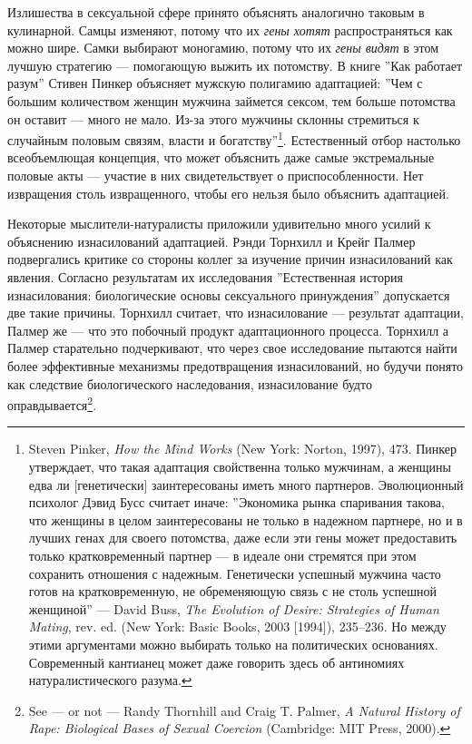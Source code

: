 \documentclass[12pt]{book}
\begin{document}
Излишества в сексуальной сфере принято объяснять аналогично таковым в кулинарной. Самцы изменяют, потому что их \textit{гены хотят} распространяться как можно шире. Самки выбирают моногамию, потому что их \textit{гены видят} в этом лучшую стратегию --- помогающую выжить их потомству. В книге ''Как работает разум'' Стивен Пинкер объясняет мужскую полигамию адаптацией: ''Чем с большим количеством женщин мужчина займется сексом, тем больше потомства он оставит --- много не мало. Из-за этого мужчины склонны стремиться к случайным половым связям, власти и богатству''\footnote{Steven Pinker, \textit{How the Mind Works} (New York: Norton, 1997), 473. Пинкер утверждает, что такая адаптация свойственна только мужчинам, а женщины едва ли [генетически] заинтересованы иметь много партнеров. Эволюционный психолог Дэвид Бусс считает иначе: ''Экономика рынка спаривания такова, что женщины в целом заинтересованы не только в надежном партнере, но и в лучших генах для своего потомства, даже если эти гены может предоставить только кратковременный партнер --- в идеале они стремятся при этом сохранить отношения с надежным. Генетически успешный мужчина часто готов на кратковременную, не обременяющую связь с не столь успешной женщиной'' --- David Buss, \textit{The Evolution of Desire: Strategies of Human Mating}, rev. ed. (New York: Basic Books, 2003 [1994]), 235–236. Но между этими аргументами можно выбирать только на политических основаниях. Современный кантианец может даже говорить здесь об антиномиях натуралистического разума.}. Естественный отбор настолько всеобъемлющая концепция, что может объяснить даже самые экстремальные половые акты --- участие в них свидетельствует о приспособленности. Нет извращения столь извращенного, чтобы его нельзя было объяснить адаптацией.

Некоторые мыслители-натуралисты приложили удивительно много усилий к объяснению изнасилований адаптацией. Рэнди Торнхилл и Крейг Палмер подвергались критике со стороны коллег за изучение причин изнасилований как явления. Согласно результатам их исследования ''Естественная история изнасилования: биологические основы сексуального принуждения'' допускается две такие причины. Торнхилл считает, что изнасилование --- результат адаптации, Палмер же --- что это побочный продукт адаптационного процесса. Торнхилл а Палмер старательно подчеркивают, что через свое исследование пытаются найти более эффективные механизмы предотвращения изнасилований, но будучи понято как следствие биологического наследования, изнасилование будто оправдывается\footnote{See — or not — Randy Thornhill and Craig T. Palmer, \textit{A Natural History of Rape: Biological Bases of Sexual Coercion} (Cambridge: MIT Press, 2000).}.
\end{document}
